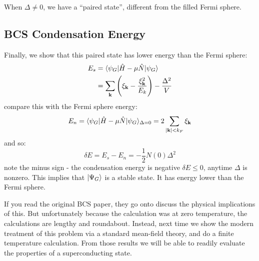 When $\Delta \neq 0$, we have a ``paired state'', different from the filled Fermi sphere.

\subsection{BCS Condensation Energy}
Finally, we show that this paired state has lower energy than the Fermi sphere:
\begin{equation}
    \begin{split}
        E_s &= \langle \psi_G \rvert\hat{H} - \mu\hat{N}\lvert \psi_G \rangle
        \\ &= \sum_{\mathbf{k}}\left(\xi_{\mathbf{k}} - \frac{\xi_{\mathbf{k}}^2}{E_k}\right) - \frac{\Delta^2}{V}
    \end{split}
\end{equation}
compare this with the Fermi sphere energy:
\begin{align*}
    E_n = \langle \psi_G \rvert\hat{H} - \mu\hat{N}\lvert \psi_G \rangle_{\Delta = 0} = 2\sum_{\lvert \mathbf{k} \rvert < k_F} \xi_{\mathbf{k}}
\end{align*}
and so:
\begin{equation}
    \boxed{\delta E = E_s - E_n = -\frac{1}{2}N(0)\Delta^2}
\end{equation}
note the minus sign - the condensation energy is negative $\delta E \leq 0$, anytime $\Delta$ is nonzero. This implies that $\lvert \Psi_G \rangle$ is a stable state. It has energy lower than the Fermi sphere.

If you read the original BCS paper, they go onto discuss the physical implications of this. But unfortunately because the calculation was at zero temperature, the calculations are lengthy and roundabout. Instead, next time we show the modern treatment of this problem via a standard mean-field theory, and do a finite temperature calculation. From those results we will be able to readily evaluate the properties of a superconducting state.
